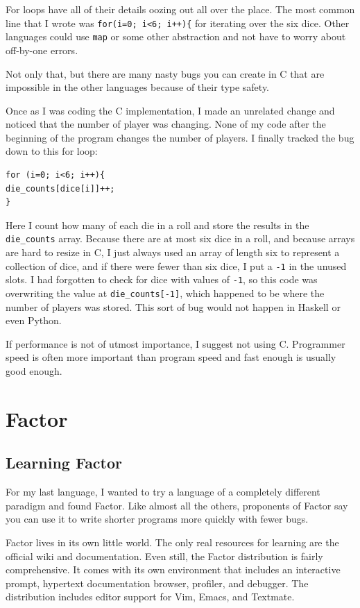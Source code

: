 \documentclass{article}
\begin{document}
For loops have all of their details oozing out all over the place.  The most
common line that I wrote was \texttt{for(i=0; i<6; i++)\{} for iterating over
the six dice.  Other languages could use \texttt{map} or some other abstraction
and not have to worry about off-by-one errors.

Not only that, but there are many nasty bugs you can create in C that are
impossible in the other languages because of their type safety.  

Once as I was coding the C implementation, I made an unrelated change and
noticed that the number of player was changing.  None of my code after the
beginning of the program changes the number of players.  I finally tracked the
bug down to this for loop:

\begin{verbatim}
for (i=0; i<6; i++){
die_counts[dice[i]]++;
}
\end{verbatim}

Here I count how many of each die in a roll and store the results in the
\texttt{die\_counts} array.  Because there are at most six dice in a roll, and because
arrays are hard to resize in C, I just always used an array of length six to
represent a collection of dice, and if there were fewer than six dice, I put a
\texttt{-1} in the unused slots.  I had forgotten to check for dice with values
of \texttt{-1}, so this code was overwriting the value at
\texttt{die\_counts[-1]}, which happened to be where the number of players was
stored.  This sort of bug would not happen in Haskell or even Python.

If performance is not of utmost importance, I suggest not using C.  Programmer
speed is often more important than program speed and fast enough is usually good
enough.

\section{Factor}

\subsection{Learning Factor}

For my last language, I wanted to try a language of a completely different
paradigm and found Factor.  Like almost all the others, proponents of Factor say
you can use it to write shorter programs more quickly with fewer bugs.

Factor lives in its own little world.  The only real resources for learning are
the official wiki and documentation.  Even still, the Factor distribution is
fairly comprehensive.  It comes with its own environment that includes an
interactive prompt, hypertext documentation browser, profiler, and debugger.
The distribution includes editor support for Vim, Emacs, and Textmate.  
\end{document}
